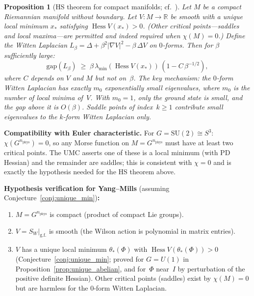 \documentclass[11pt,a4paper]{article}
\theoremstyle{plain}
\newtheorem{proposition}[theorem]{Proposition}
\theoremstyle{definition}
\theoremstyle{remark}
\newcommand{\R}{\mathbb{R}}
\newcommand{\Hess}{\operatorname{Hess}}
\newcommand{\SU}{\mathrm{SU}}
\newcommand{\gap}{\mathrm{gap}}
\begin{document}
\begin{proposition}[HS theorem for compact manifolds;
cf.~\cite{HelfferSjostrand,Helffer02}]
\label{prop:hs}
Let $M$ be a compact Riemannian manifold without boundary.
Let $V \colon M \to \R$ be smooth with a
\emph{unique local minimum} $x_*$ satisfying
$\Hess V(x_*) > 0$.
\textup{(}Other critical points---saddles and local
maxima---are permitted and indeed required
when $\chi(M) = 0$.\textup{)}
Define the Witten Laplacian $L_\beta = \Delta
+ \beta^2 |\nabla V|^2 - \beta\,\Delta V$
on $0$-forms.
Then for $\beta$ sufficiently large:
\begin{equation}
  \gap(L_\beta) \;\geq\;
  \beta\,\lambda_{\min}(\Hess V(x_*))\,
  (1 - C\,\beta^{-1/2}),
\end{equation}
where $C$ depends on $V$ and $M$ but not on~$\beta$.
The key mechanism: the $0$-form Witten Laplacian has
exactly $m_0$ exponentially small eigenvalues,
where $m_0$ is the number of local minima of~$V$.
With $m_0 = 1$, only the ground state is small,
and the gap above it is $O(\beta)$.
Saddle points of index~$k \geq 1$ contribute small
eigenvalues to the $k$-form Witten Laplacian only.
\end{proposition}

\noindent
\textbf{Compatibility with Euler characteristic.}
For $G = \SU(2) \cong S^3$:
$\chi(G^{n_{\mathrm{phys}}}) = 0$, so any Morse
function on $M = G^{n_{\mathrm{phys}}}$ must have
at least two critical points.  The UMC asserts
one of these is a local minimum (with PD Hessian) and
the remainder are saddles; this is consistent with
$\chi = 0$ and is exactly the hypothesis needed for
the HS theorem above.

\noindent
\textbf{Hypothesis verification for Yang--Mills}
(assuming Conjecture~\ref{conj:unique_min})\textbf{:}
\begin{enumerate}[label=(H\arabic*),nosep]
  \item $M = G^{n_{\mathrm{phys}}}$ is compact
    (product of compact Lie groups).
  \item $V = S_W|_{\mathrm{g.f.}}$ is smooth
    (the Wilson action is polynomial in matrix entries).
  \item $V$ has a unique local minimum $\theta_*(\Phi)$
    with $\Hess V(\theta_*(\Phi)) > 0$
    (Conjecture~\ref{conj:unique_min}; proved for
    $G = U(1)$ in Proposition~\ref{prop:unique_abelian},
    and for~$\Phi$ near~$I$ by perturbation of the
    positive definite Hessian).
    Other critical points (saddles) exist by
    $\chi(M) = 0$ but are harmless for the
    $0$-form Witten Laplacian.
\end{enumerate}
\end{document}
